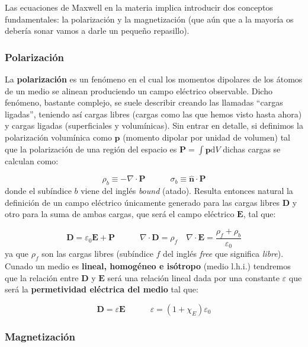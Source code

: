 \documentclass[12pt,a4paper]{article}
\newcommand{\D}{\mathrm{d}}
\newcommand{\tquad}{\quad \quad \quad}
\newcommand{\dive}{\nabla \cdot}
\newcommand{\En}{\mathbf{E}}
\newcommand{\Dn}{\mathbf{D}}
\newcommand{\Pn}{\mathbf{P}}
\newcommand{\pn}{\mathbf{p}}
\newcommand{\hnn}{\hat{\mathbf{n}}}
\numberwithin{equation}{section}
\numberwithin{figure}{section}
\begin{document}
Las ecuaciones de Maxwell en la materia implica introducir dos conceptos fundamentales: la polarización y la magnetización (que aún que a la mayoría os debería sonar vamos a darle un pequeño repasillo). \\

\subsubsection{Polarización}

La \textbf{polarización} es un fenómeno en el cual los momentos dipolares de los átomos de un medio se alinean produciendo un campo eléctrico observable. Dicho fenómeno, bastante complejo, se suele describir creando las llamadas ``cargas ligadas'', teniendo así cargas libres (cargas como las que hemos visto hasta ahora) y cargas ligadas (superficiales y volumínicas). Sin entrar en detalle, si definimos la polarización volumínica como $\pn$ (momento dipolar por unidad de volumen) tal que la polarización de una región del espacio es $\Pn = \int \pn \D V$ dichas cargas se calculan como:

\begin{equation}
\rho_{b} \equiv - \dive \Pn \tquad \sigma_b \equiv \hnn \cdot \Pn
\end{equation}
donde el subíndice $b$ viene del inglés \textit{bound} (atado). Resulta entonces natural la definición de un campo eléctrico únicamente generado para las cargas libres $\Dn$ y otro para la suma de ambas cargas, que será el campo eléctrico $\En$, tal que:

\begin{equation}
\Dn = \varepsilon_0 \En + \Pn \tquad \dive \Dn = \rho_f \quad \dive \En = \dfrac{\rho_f + \rho_b}{\varepsilon_0}
\end{equation}
ya que $\rho_f$ son las cargas libres (subíndice $f$ del inglés \textit{free} que significa \textit{libre}). Cunado un medio es \textbf{lineal, homogéneo e isótropo} (medio l.h.i.) tendremos que la relación entre $\Dn$ y $\En$ será una relación lineal dada por una constante $\varepsilon$ que será la \textbf{permetividad eléctrica del medio} tal que:

\begin{equation}
\Dn = \varepsilon \En \tquad \varepsilon = (1+\chi_E) \varepsilon_0
\end{equation}

\subsubsection{Magnetización}
\end{document}

